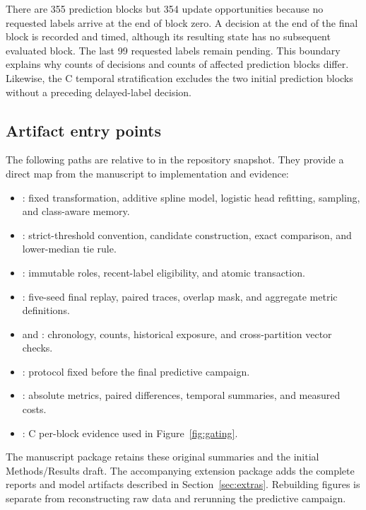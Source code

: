 There are 355 prediction blocks but 354 update opportunities because no requested labels arrive at the end of block zero. A decision at the end of the final block is recorded and timed, although its resulting state has no subsequent evaluated block. The last 99 requested labels remain pending. This boundary explains why counts of decisions and counts of affected prediction blocks differ. Likewise, the C temporal stratification excludes the two initial prediction blocks without a preceding delayed-label decision.

\subsection{Artifact entry points}
The following paths are relative to  in the repository snapshot. They provide a direct map from the manuscript to implementation and evidence:
\begin{itemize}\raggedright
\item {}: fixed transformation, additive spline model, logistic head refitting, sampling, and class-aware memory.
\item {}: strict-threshold convention, candidate construction, exact comparison, and lower-median tie rule.
\item {}: immutable roles, recent-label eligibility, and atomic transaction.
\item {}: five-seed final replay, paired traces, overlap mask, and aggregate metric definitions.
\item {} and : chronology, counts, historical exposure, and cross-partition vector checks.
\item {}: protocol fixed before the final predictive campaign.
\item {}: absolute metrics, paired differences, temporal summaries, and measured costs.
\item {}: C per-block evidence used in Figure~\ref{fig:gating}.
\end{itemize}
The manuscript package retains these original summaries and the initial Methods/Results draft. The accompanying extension package adds the complete reports and model artifacts described in Section~\ref{sec:extras}. Rebuilding figures is separate from reconstructing raw data and rerunning the predictive campaign.

